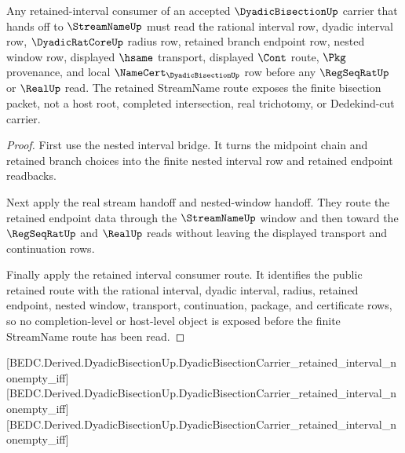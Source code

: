 \begin{theorem}
\label{thm:dyadic-bisection-streamname-retained-route}
Any retained-interval consumer of an accepted $\DyadicBisectionUp$ carrier that hands off to $\StreamNameUp$ must read the rational interval row, dyadic interval row, $\DyadicRatCoreUp$ radius row, retained branch endpoint row, nested window row, displayed $\hsame$ transport, displayed $\Cont$ route, $\Pkg$ provenance, and local $\NameCert_{\DyadicBisectionUp}$ row before any $\RegSeqRatUp$ or $\RealUp$ read. The retained StreamName route exposes the finite bisection packet, not a host root, completed intersection, real trichotomy, or Dedekind-cut carrier.
\end{theorem}
\begin{proof}
First use the nested interval bridge. It turns the midpoint chain and retained branch choices into the finite nested interval row and retained endpoint readbacks.

Next apply the real stream handoff and nested-window handoff. They route the retained endpoint data through the $\StreamNameUp$ window and then toward the $\RegSeqRatUp$ and $\RealUp$ reads without leaving the displayed transport and continuation rows.

Finally apply the retained interval consumer route. It identifies the public retained route with the rational interval, dyadic interval, radius, retained endpoint, nested window, transport, continuation, package, and certificate rows, so no completion-level or host-level object is exposed before the finite StreamName route has been read.
\end{proof}

[BEDC.Derived.DyadicBisectionUp.DyadicBisectionCarrier\_retained\_interval\_nonempty\_iff]
[BEDC.Derived.DyadicBisectionUp.DyadicBisectionCarrier\_retained\_interval\_nonempty\_iff]
[BEDC.Derived.DyadicBisectionUp.DyadicBisectionCarrier\_retained\_interval\_nonempty\_iff]

